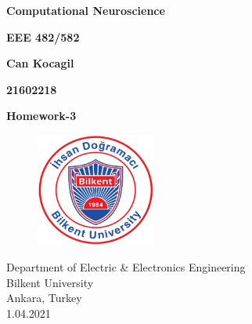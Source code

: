 \documentclass[12pt]{amsart}
\begin{document}
\begin{titlepage}
   \begin{center}
       \vspace*{1cm}

       \textbf{Computational Neuroscience}

       \vspace{0.7cm}
        \textbf{EEE 482/582}
            
       \vspace{0.7cm}

       \textbf{Can Kocagil} 
       
       \vspace{0.7cm}
       \textbf{21602218}

       \vspace{0.7cm}
            
       \textbf{Homework-3}
            
       \vspace{0.8cm}
         \begin{figure}[h]
            \centering
            \includegraphics[width = 0.35\textwidth]{images/bilkent_logo.png}
        \end{figure}
       \vspace{0.7cm}  
       Department of Electric \& Electronics Engineering \\
       \vspace{0.7cm}
       Bilkent University\\
       \vspace{0.7cm}
       Ankara, Turkey \\
       \vspace{0.7cm}
       1.04.2021
            
   \end{center}
\end{titlepage}

\tableofcontents
\newpage
\listoffigures
\lstlistoflistings
\end{document}
